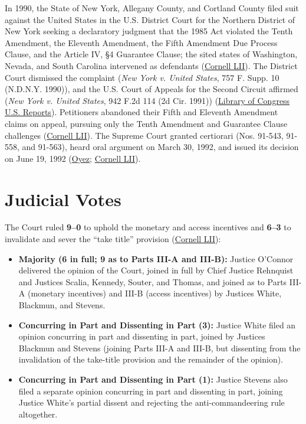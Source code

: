 \documentclass[12pt]{article}
\begin{document}
In 1990, the State of New York, Allegany County, and Cortland County filed suit against the United States in the U.S. District Court for the Northern District of New York seeking a declaratory judgment that the 1985 Act violated the Tenth Amendment, the Eleventh Amendment, the Fifth Amendment Due Process Clause, and the Article IV, \S 4 Guarantee Clause; the sited states of Washington, Nevada, and South Carolina intervened as defendants (\href{https://www.law.cornell.edu/supremecourt/text/505/144}{Cornell LII}). The District Court dismissed the complaint (\textit{New York v. United States}, 757 F. Supp. 10 (N.D.N.Y. 1990)), and the U.S. Court of Appeals for the Second Circuit affirmed (\textit{New York v. United States}, 942 F.2d 114 (2d Cir. 1991)) (\href{https://tile.loc.gov/storage-services/service/ll/usrep/usrep505/usrep505144/usrep505144.pdf}{Library of Congress U.S. Reports}). Petitioners abandoned their Fifth and Eleventh Amendment claims on appeal, pursuing only the Tenth Amendment and Guarantee Clause challenges (\href{https://www.law.cornell.edu/supremecourt/text/505/144}{Cornell LII}). The Supreme Court granted certiorari (Nos. 91-543, 91-558, and 91-563), heard oral argument on March 30, 1992, and issued its decision on June 19, 1992 (\href{https://www.oyez.org/cases/1991/91-543}{Oyez}; \href{https://www.law.cornell.edu/supremecourt/text/505/144}{Cornell LII}).

\section{Judicial Votes}

The Court ruled \textbf{9--0} to uphold the monetary and access incentives and \textbf{6--3} to invalidate and sever the ``take title'' provision (\href{https://www.law.cornell.edu/supremecourt/text/505/144}{Cornell LII}):
\begin{itemize}
    \item \textbf{Majority (6 in full; 9 as to Parts III-A and III-B):} Justice O'Connor delivered the opinion of the Court, joined in full by Chief Justice Rehnquist and Justices Scalia, Kennedy, Souter, and Thomas, and joined as to Parts III-A (monetary incentives) and III-B (access incentives) by Justices White, Blackmun, and Stevens.
    \item \textbf{Concurring in Part and Dissenting in Part (3):} Justice White filed an opinion concurring in part and dissenting in part, joined by Justices Blackmun and Stevens (joining Parts III-A and III-B, but dissenting from the invalidation of the take-title provision and the remainder of the opinion).
    \item \textbf{Concurring in Part and Dissenting in Part (1):} Justice Stevens also filed a separate opinion concurring in part and dissenting in part, joining Justice White's partial dissent and rejecting the anti-commandeering rule altogether.
\end{itemize}
\end{document}
